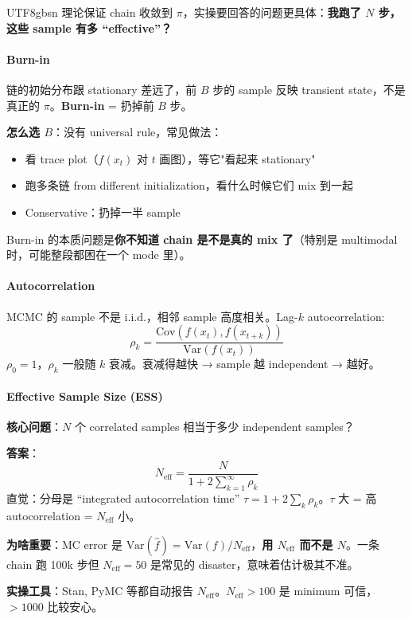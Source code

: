 \documentclass[11pt]{article}
\begin{document}
\begin{CJK}{UTF8}{gbsn}
理论保证 chain 收敛到 $\pi$，实操要回答的问题更具体：\textbf{我跑了 $N$ 步，这些 sample 有多 ``effective''？}

\paragraph{Burn-in}

链的初始分布跟 stationary 差远了，前 $B$ 步的 sample 反映 transient state，不是真正的 $\pi$。\textbf{Burn-in} = 扔掉前 $B$ 步。

\textbf{怎么选 $B$}：没有 universal rule，常见做法：
\begin{itemize}[nosep]
  \item 看 trace plot（$f(x_t)$ 对 $t$ 画图），等它"看起来 stationary"
  \item 跑多条链 from different initialization，看什么时候它们 mix 到一起
  \item Conservative：扔掉一半 sample
\end{itemize}
Burn-in 的本质问题是\textbf{你不知道 chain 是不是真的 mix 了}（特别是 multimodal 时，可能整段都困在一个 mode 里）。

\paragraph{Autocorrelation}

MCMC 的 sample 不是 i.i.d.，相邻 sample 高度相关。Lag-$k$ autocorrelation:
\[
\rho_k = \frac{\text{Cov}(f(x_t), f(x_{t+k}))}{\text{Var}(f(x_t))}
\]
$\rho_0 = 1$，$\rho_k$ 一般随 $k$ 衰减。衰减得越快 → sample 越 independent → 越好。

\paragraph{Effective Sample Size (ESS)}

\textbf{核心问题}：$N$ 个 correlated samples 相当于多少 independent samples？

\textbf{答案}：
\[
\boxed{N_{\text{eff}} = \frac{N}{1 + 2 \sum_{k=1}^{\infty} \rho_k}}
\]
直觉：分母是 ``integrated autocorrelation time'' $\tau = 1 + 2\sum_k \rho_k$。$\tau$ 大 = 高 autocorrelation = $N_{\text{eff}}$ 小。

\textbf{为啥重要}：MC error 是 $\text{Var}(\hat f) = \text{Var}(f) / N_{\text{eff}}$，\textbf{用 $N_{\text{eff}}$ 而不是 $N$}。一条 chain 跑 100k 步但 $N_{\text{eff}} = 50$ 是常见的 disaster，意味着估计极其不准。

\textbf{实操工具}：Stan, PyMC 等都自动报告 $N_{\text{eff}}$。$N_{\text{eff}} > 100$ 是 minimum 可信，$> 1000$ 比较安心。


\end{CJK}
\end{document}
